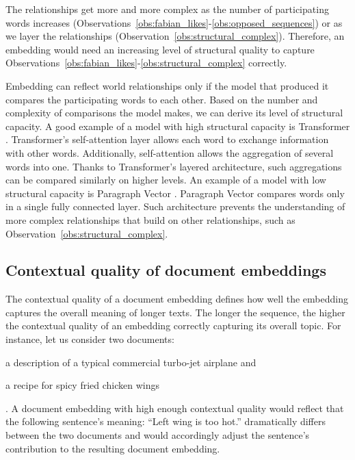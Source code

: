 The relationships get more and more complex as the number of participating
words increases
(Observations~\ref{obs:fabian_likes}-\ref{obs:opposed_sequences}) or as we
layer the relationships (Observation~\ref{obs:structural_complex}).
Therefore, an embedding would need an increasing level of structural quality to
capture Observations~\ref{obs:fabian_likes}-\ref{obs:structural_complex}
correctly.

Embedding can reflect world relationships only if the model that produced it
compares the participating words to each other. Based on the number and
complexity of comparisons the model makes, we can derive its level of
structural capacity. A good example of a model with high structural capacity is
Transformer \citep{vaswani2017attention}. Transformer's self-attention layer
allows each word to exchange information with other words. Additionally,
self-attention allows the aggregation of several words into one. Thanks to
Transformer's layered architecture, such aggregations can be compared similarly
on higher levels. An example of a model with low structural capacity is
Paragraph Vector \citep{le2014distributed}. Paragraph Vector compares words
only in a single fully connected layer. Such architecture prevents the
understanding of more complex relationships that build on other relationships,
such as Observation~\ref{obs:structural_complex}.

\subsection{Contextual quality of document embeddings}


The contextual quality of a document embedding defines how well the embedding
captures the overall meaning of longer texts. The longer the sequence, the
higher the contextual quality of an embedding correctly
capturing its overall topic. For instance, let us consider two
documents: \begin{enumerate*}
  \item a description of a typical commercial turbo-jet airplane
    and\label{enumitem:plane}
  \item a recipe for spicy fried chicken wings\label{enumitem:chicken}
\end{enumerate*}.
A document embedding with high enough contextual quality would reflect that the
following sentence's meaning: ``Left wing is too hot.'' dramatically differs between
the two documents and would accordingly adjust the sentence's contribution to
the resulting document embedding.

